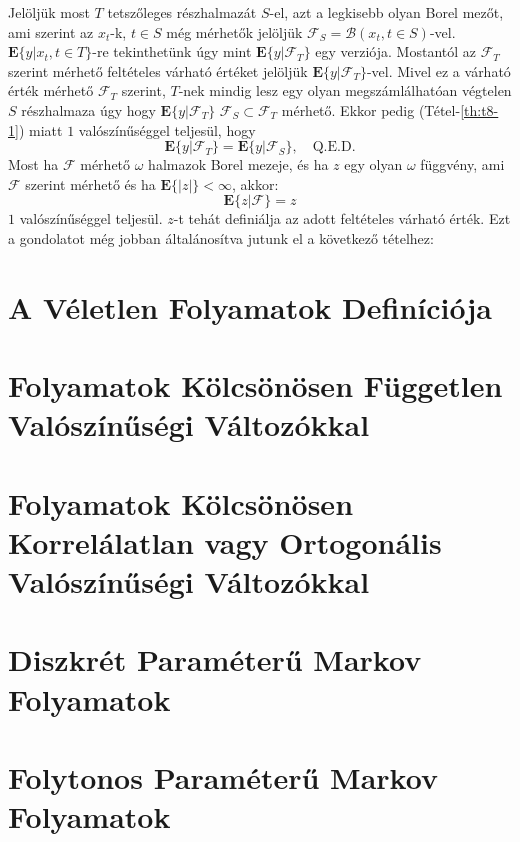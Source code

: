 \documentclass{article}
\begin{document}
Jelöljük most $T$ tetszőleges részhalmazát $S$-el, azt a legkisebb olyan Borel mezőt, ami szerint az $x_t$-k, $t \in S$ még mérhetők jelöljük $\mathscr{F}_S = \mathscr{B}(x_t, t \in S)$-vel. $\mathrm{\textbf{E}}\{y | x_t, t \in T \}$-re tekinthetünk úgy mint $\mathrm{\textbf{E}}\{y | \mathscr{F}_T \}$ egy verziója. Mostantól az $\mathscr{F}_T$ szerint mérhető feltételes várható értéket jelöljük $\mathrm{\textbf{E}}\{y | \mathscr{F}_T \}$-vel. Mivel ez a várható érték mérhető $\mathscr{F}_T$ szerint, $T$-nek mindig lesz egy olyan megszámlálhatóan végtelen $S$ részhalmaza úgy hogy $\mathrm{\textbf{E}}\{y | \mathscr{F}_T \}$ $\mathscr{F}_S \subset \mathscr{F}_T$ mérhető. Ekkor pedig (Tétel-\ref{th:t8-1}) miatt $1$ valószínűséggel teljesül, hogy 
\[
 \mathrm{\textbf{E}}\{y | \mathscr{F}_T \} = \mathrm{\textbf{E}}\{y | \mathscr{F}_S \}, \quad \mathrm{Q.E.D.}
\]
Most ha $\mathscr{F}$ mérhető $\omega$ halmazok Borel mezeje, és ha $z$ egy olyan $\omega$ függvény, ami $\mathscr{F}$ szerint mérhető és ha $\mathrm{\textbf{E}}\{|z|\} < \infty$, akkor:
\[
	\mathrm{\textbf{E}}\{z | \mathscr{F} \} = z
\]
$1$ valószínűséggel teljesül. $z$-t tehát definiálja az adott feltételes várható érték. Ezt a gondolatot még jobban általánosítva jutunk el a következő tételhez:

\section{A Véletlen Folyamatok Definíciója}\label{sec:veletlenfolyamatokdefinicioja}
\section{Folyamatok Kölcsönösen Független Valószínűségi Változókkal}\label{sec:folyamatokkolcsonosenfuggetlenvaloszinusegivaltozokkal}
\section{Folyamatok Kölcsönösen Korrelálatlan vagy Ortogonális Valószínűségi Változókkal}\label{sec:folyamatokkolcsonosenkorrelalatlanvagyortogonalisvaloszinusegivaltozokkal}
\section{Diszkrét Paraméterű Markov Folyamatok}\label{sec:diszkretparameterumarkov}
\section{Folytonos Paraméterű Markov Folyamatok}\label{sec:folytonosparameterumarkov}
\end{document}
